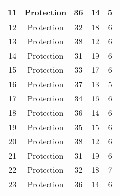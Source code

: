 \documentclass[results.tex]{subfiles}
\begin{document}
\begin{center}
\begin{tabular}{| c || c | c | c | c |}
            \hline
            11                      & Protection                   & 36                     & 14                      & 5                    \\
            \hline
            12                      & Protection                   & 32                     & 18                      & 6                    \\
            \hline
            13                      & Protection                   & 38                     & 12                      & 6                    \\
            \hline
            14                      & Protection                   & 31                     & 19                      & 6                    \\
            \hline
            15                      & Protection                   & 33                     & 17                      & 6                    \\
            \hline
            16                      & Protection                   & 37                     & 13                      & 5                    \\
            \hline
            17                      & Protection                   & 34                     & 16                      & 6                    \\
            \hline
            18                      & Protection                   & 36                     & 14                      & 6                    \\
            \hline
            19                      & Protection                   & 35                     & 15                      & 6                    \\
            \hline
            20                      & Protection                   & 38                     & 12                      & 6                    \\
            \hline
            21                      & Protection                   & 31                     & 19                      & 6                    \\
            \hline
            22                      & Protection                   & 32                     & 18                      & 7                    \\
            \hline
            23                      & Protection                   & 36                     & 14                      & 6                    \\

\end{tabular}
\end{center}
\end{document}
